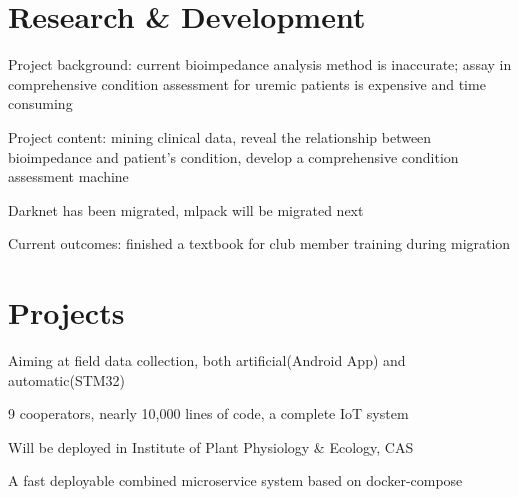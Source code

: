 \documentclass[]{deedy-resume-openfont}
\begin{document}
\hfill
\begin{minipage}[t]{0.73\textwidth} 


\section{Research \& Development}
\descript{}
\vspace{\topsep}
\begin{tightemize}
\item Project background: current bioimpedance analysis method is inaccurate; assay in comprehensive condition assessment for uremic patients is expensive and time consuming
\item Project content: mining clinical data, reveal the relationship between bioimpedance and patient's condition, develop a comprehensive condition assessment machine
\end{tightemize}
\sectionsep

\descript{}
\begin{tightemize}
    \item Darknet has been migrated, mlpack will be migrated next
    \item Current outcomes: finished a textbook for club member training during migration
\end{tightemize}
\sectionsep

\section{Projects}
    \begin{tightemize}
        \item Aiming at field data collection, both artificial(Android App) and automatic(STM32)
        \item 9 cooperators, nearly 10,000 lines of code, a complete IoT system
		\item Will be deployed in Institute of Plant Physiology \& Ecology, CAS
		\item A fast deployable combined microservice system based on docker-compose
	\end{tightemize}
	\sectionsep


\end{minipage}
\end{document}
